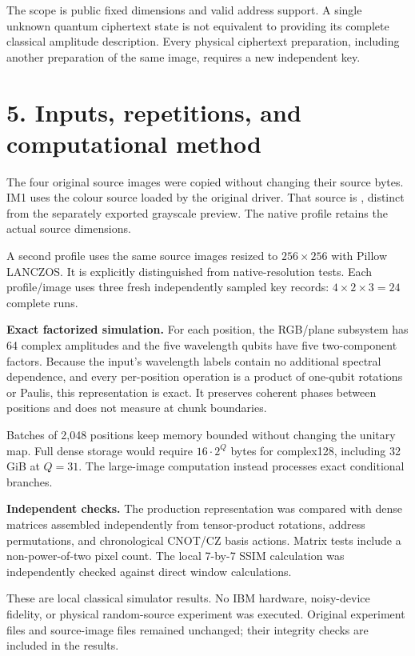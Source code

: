 \documentclass[11pt,a4paper]{article}
\begin{document}
The scope is public fixed dimensions and valid address support. A single unknown quantum ciphertext state is not equivalent to providing its complete classical amplitude description. Every physical ciphertext preparation, including another preparation of the same image, requires a new independent key.

\newpage
\section*{5. Inputs, repetitions, and computational method}
The four original source images were copied without changing their source bytes. IM1 uses the colour source loaded by the original driver. That source is , distinct from the separately exported grayscale preview. The native profile retains the actual source dimensions.



A second profile uses the same source images resized to \(256\times256\) with Pillow LANCZOS. It is explicitly distinguished from native-resolution tests. Each profile/image uses three fresh independently sampled key records: \(4\times2\times3=24\) complete runs.

\textbf{Exact factorized simulation.} For each position, the RGB/plane subsystem has 64 complex amplitudes and the five wavelength qubits have five two-component factors. Because the input's wavelength labels contain no additional spectral dependence, and every per-position operation is a product of one-qubit rotations or Paulis, this representation is exact. It preserves coherent phases between positions and does not measure at chunk boundaries.

Batches of 2,048 positions keep memory bounded without changing the unitary map. Full dense storage would require \(16\cdot2^Q\) bytes for complex128, including 32 GiB at \(Q=31\). The large-image computation instead processes exact conditional branches.

\textbf{Independent checks.} The production representation was compared with dense matrices assembled independently from tensor-product rotations, address permutations, and chronological CNOT/CZ basis actions. Matrix tests include a non-power-of-two pixel count. The local 7-by-7 SSIM calculation was independently checked against direct window calculations.

These are local classical simulator results. No IBM hardware, noisy-device fidelity, or physical random-source experiment was executed. Original experiment files and source-image files remained unchanged; their integrity checks are included in the results.
\end{document}
